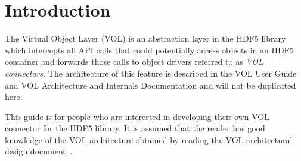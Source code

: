 

\section{Introduction}
The Virtual Object Layer (VOL) is an abstraction layer in the HDF5
library which intercepts all API calls that could potentially access
objects in an HDF5 container and forwards those calls to object drivers
referred to as \textit{VOL connectors}. The architecture of this feature
is described in the VOL User Guide and VOL Architecture and Internals
Documentation and will not be duplicated here.

This guide is for people who are interested in developing their own VOL
connector for the HDF5 library. It is assumed that the reader has good knowledge
of the VOL architecture obtained by reading the VOL architectural design
document~\cite{vol:rfc}.
